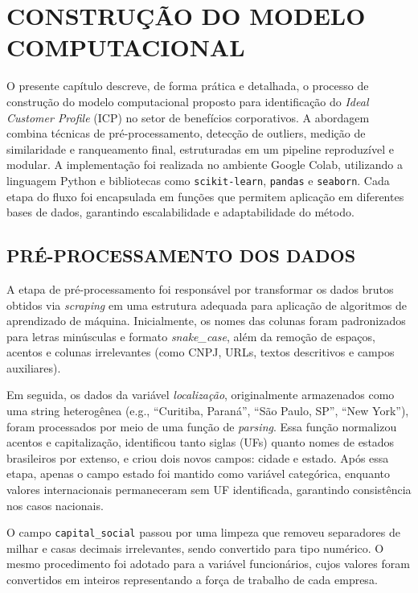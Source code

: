 \chapter{CONSTRUÇÃO DO MODELO COMPUTACIONAL}

O presente capítulo descreve, de forma prática e detalhada, o processo de construção do modelo computacional proposto para identificação do \textit{Ideal Customer Profile} (ICP) no setor de benefícios corporativos. A abordagem combina técnicas de pré-processamento, detecção de outliers, medição de similaridade e ranqueamento final, estruturadas em um pipeline reproduzível e modular. A implementação foi realizada no ambiente Google Colab, utilizando a linguagem Python e bibliotecas como \texttt{scikit-learn}, \texttt{pandas} e \texttt{seaborn}. Cada etapa do fluxo foi encapsulada em funções que permitem aplicação em diferentes bases de dados, garantindo escalabilidade e adaptabilidade do método.

\section{PRÉ-PROCESSAMENTO DOS DADOS}

A etapa de pré-processamento foi responsável por transformar os dados brutos obtidos via \textit{scraping} em uma estrutura adequada para aplicação de algoritmos de aprendizado de máquina. Inicialmente, os nomes das colunas foram padronizados para letras minúsculas e formato \textit{snake\_case}, além da remoção de espaços, acentos e colunas irrelevantes (como CNPJ, URLs, textos descritivos e campos auxiliares).

Em seguida, os dados da variável \textit{localização}, originalmente armazenados como uma string heterogênea (e.g., ``Curitiba, Paraná'', ``São Paulo, SP'', ``New York''), foram processados por meio de uma função de \textit{parsing}. Essa função normalizou acentos e capitalização, identificou tanto siglas (UFs) quanto nomes de estados brasileiros por extenso, e criou dois novos campos: cidade e estado. Após essa etapa, apenas o campo estado foi mantido como variável categórica, enquanto valores internacionais permaneceram sem UF identificada, garantindo consistência nos casos nacionais.

O campo \texttt{capital\_social} passou por uma limpeza que removeu separadores de milhar e casas decimais irrelevantes, sendo convertido para tipo numérico. O mesmo procedimento foi adotado para a variável funcionários, cujos valores foram convertidos em inteiros representando a força de trabalho de cada empresa.

